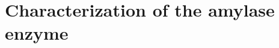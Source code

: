 \documentclass{book}
\begin{document}
 
 
 
 	\newcommand\chapterlabel{}\newcommand\ChapterNameLabel{}\newcommand\labname{}\newcommand\chapterpathtocontent{}\newcommand\chapterpathtoimages{}\newcommand\chapterpath{} 

\section{Characterization of the amylase enzyme}
\renewcommand\chapterlabel{Ch-kinetics}\renewcommand\ChapterNameLabel{\chapterlabel}\renewcommand\labname{amylase}\renewcommand\chapterpathtocontent{../../}\renewcommand\chapterpathtoimages{\chapterpathtocontent}\renewcommand\chapterpath{../../\chapterlabel/LAB-\labname/}
\end{document}
